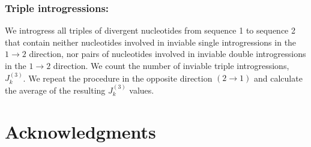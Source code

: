\documentclass[9pt,lineno]{elife}
\begin{document}
\subsubsection{Triple introgressions:}
We introgress all triples of divergent nucleotides from sequence 1 to sequence 2 that contain neither nucleotides involved in inviable single introgressions in the $1\to 2$ direction, nor pairs of nucleotides involved in inviable double introgressions in the $1\to 2$ direction.  We count the number of inviable triple introgressions, $J_{k}^{(3)}$.  We repeat the procedure in the opposite direction $(2\to1)$ and calculate the average of the resulting $J_{k}^{(3)}$ values.

\section{Acknowledgments}


\nocite{*} %


\end{document}
